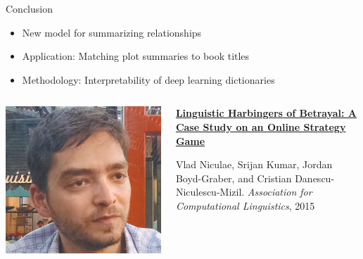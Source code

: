 \documentclass[compress]{beamer}
\begin{document}
\begin{frame}[plain]
\vspace*{-1pt}
\end{frame}

\begin{frame}{Conclusion}


  \begin{itemize}
    \item New model for summarizing relationships
    \item Application: Matching plot summaries to book titles
    \item Methodology: Interpretability of deep learning dictionaries
  \end{itemize}

\end{frame}


\begin{frame}{}

  \begin{columns}
        \includegraphics[width=0.7\linewidth]{general_figures/vlad}
        \begin{block}{{\bf
              \href{http://cs.colorado.edu/~jbg//docs/2015_acl_diplomacy.pdf}{Linguistic Harbingers of Betrayal: A Case Study on an Online Strategy Game}}}

          Vlad Niculae, Srijan Kumar, Jordan Boyd-Graber, and Cristian
          Danescu-Niculescu-Mizil. \emph{Association for Computational Linguistics}, 2015
        \end{block}

  \end{columns}
\end{frame}
\end{document}
